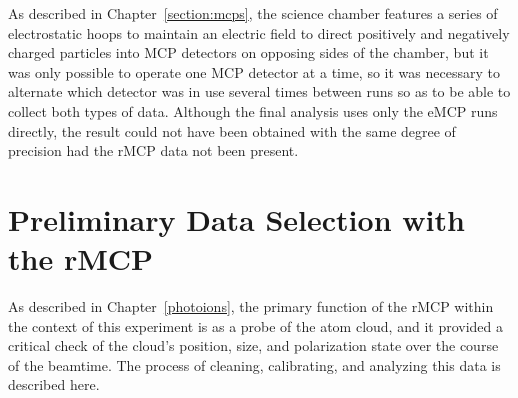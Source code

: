 



%

As described in Chapter~\ref{section:mcps}, the science chamber features a series of electrostatic hoops to maintain an electric field to direct positively and negatively charged particles into MCP detectors on opposing sides of the chamber, but it was only possible to operate one MCP detector at a time, so it was necessary to alternate which detector was in use several times between runs so as to be able to collect both types of data.  Although the final analysis uses only the eMCP runs directly, the result could not have been obtained with the same degree of precision had the rMCP data not been present.  


\FloatBarrier
\section{Preliminary Data Selection with the rMCP}
\label{sec:rmcp_cuts}
As described in Chapter~\ref{photoions}, the primary function of the rMCP within the context of this experiment is as a probe of the atom cloud, and it provided a critical check of the cloud's position, size, and polarization state over the course of the beamtime.  The process of cleaning, calibrating, and analyzing this data is described here.  

